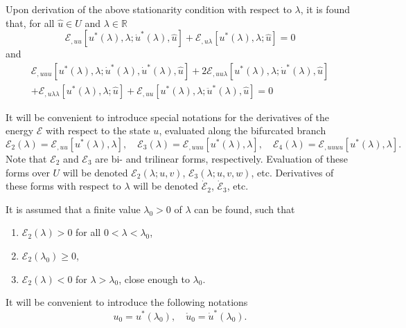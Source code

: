 \documentclass[12pt, final]{scrartcl}
\theoremstyle{definition}
\newcommand{\E}{\mathcal E}
\newcommand{\reals}{\mathbb{R}}
\begin{document}
Upon derivation of the above stationarity condition with respect to \(\lambda\), it is found that, for all
\(\hat{u} \in U\) and \(\lambda \in \reals\)
\begin{equation}
  \label{eq:20220901143843}
  \E_{,uu}[u^\ast(\lambda), \lambda; \dot{u}^\ast(\lambda), \hat{u}] + \E_{,u\lambda}[u^\ast(\lambda), \lambda; \hat{u}] = 0
\end{equation}
and
\begin{multline}
  \label{eq:20220901143902}
  \E_{,uuu}[u^\ast(\lambda), \lambda; \dot{u}^\ast(\lambda), \dot{u}^\ast(\lambda), \hat{u}] + 2\E_{,uu\lambda}[u^\ast(\lambda), \lambda; \dot{u}^\ast(\lambda), \hat{u}]\\
  + \E_{,u\lambda\lambda}[u^\ast(\lambda), \lambda; \hat{u}] + \E_{,uu}[u^\ast(\lambda), \lambda; \ddot{u}^\ast(\lambda), \hat{u}] = 0
\end{multline}

It will be convenient to introduce special notations for the derivatives of the energy $\E$ with respect to the state
\(u\), evaluated along the bifurcated branch
\begin{equation}
  \E_2(\lambda) = \E_{,uu}[u^{\ast}(\lambda), \lambda], \quad \E_3(\lambda) = \E_{,uuu}[u^{\ast}(\lambda), \lambda], \quad \E_4(\lambda) = \E_{,uuuu} [u^{\ast}(\lambda), \lambda].
\end{equation}
Note that $\E_2$ and $\E_3$ are bi- and trilinear forms, respectively.  Evaluation of these forms over $U$ will be
denoted $\E_2(\lambda; u, v)$, $\E_3(\lambda; u, v, w)$, etc.  Derivatives of these forms with respect to $\lambda$ will
be denoted $\dot{\E}_2$, $\dot{\E}_3$, etc.

It is assumed that a finite value $\lambda_0 > 0$ of $\lambda$ can be found, such that
\begin{enumerate}
\item \label{item:20221017185946} $\E_2(\lambda) > 0$ for all $0 < \lambda < \lambda_0$,
\item \label{item:20221017190357} $\E_2(\lambda_0) \geq 0$,
\item \label{item:20221017190003} $\E_2(\lambda) < 0$ for $\lambda > \lambda_0$, close enough to $\lambda_0$.
\end{enumerate}

It will be convenient to introduce the following notations
\begin{equation}
  u_0 = u^\ast(\lambda_0), \quad \mathring{u}_0 = \dot{u}^\ast(\lambda_0).
\end{equation}
\end{document}
